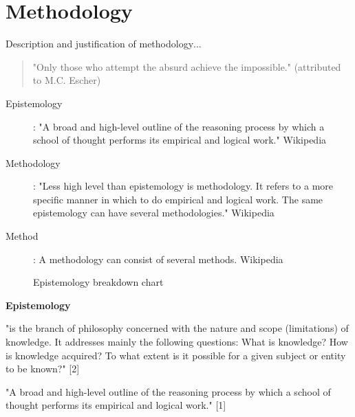 
\chapter{Methodology}
\label{ch:method}

\begin{shaded}
  Description and justification of methodology$\ldots$
\end{shaded}

\begin{quote}
  "Only those who attempt the absurd achieve the impossible." (attributed to M.C. Escher)
\end{quote}

\begin{description}
  \item [Epistemology]:	"A broad and high-level outline of the reasoning process by which a school of thought performs its empirical and logical work." Wikipedia
  \item [Methodology]: "Less high level than epistemology is methodology. It refers to a more specific manner in which to do empirical and logical work. The same epistemology can have several methodologies." Wikipedia
  \item [Method]:	A methodology can consist of several methods. Wikipedia
\end{description}

\begin{figure}
  \centering
  \caption[Epistemology]{Epistemology breakdown chart}
  \label{fig:method}
\end{figure}

\textbf{Epistemology}

"is the branch of philosophy concerned with the nature and scope (limitations) of knowledge. It addresses mainly the following questions: What is knowledge? How is knowledge acquired? To what extent is it possible for a given subject or entity to be known?" [2]

"A broad and high-level outline of the reasoning process by which a school of thought performs its empirical and logical work." [1]

